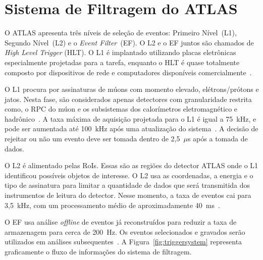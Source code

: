 
\chapter{Sistema de Filtragem do ATLAS}

O ATLAS apresenta três níveis de seleção de eventos: Primeiro Nível~(L1),
Segundo Nível~(L2) e o \emph{Event Filter}~(EF). O L2 e o EF juntos são chamados
de \emph{High Level Trigger} (HLT). O L1 é implantado utilizando placas
eletrônicas especialmente projetadas para a tarefa, enquanto o HLT é quase 
totalmente composto por dispositivos de rede e computadores disponíveis
comercialmente~\cite{ref:2010performance}.

O L1 procura por assinaturas de múons com momento elevado, elétrons/prótons e
jatos. Nesta fase, são considerados apenas detectores com granularidade restrita
como, o RPC do múon e os subsistemas dos calorímetros eletromagnético e
hadrônico~\cite{LEVEL1TRIGGER}. A taxa máxima de aquisição projetada para o L1 é
igual a 75~kHz, e pode ser aumentada até 100~kHz após uma atualização do
sistema~\cite{ATLAS2008}. A decisão de rejeitar ou não um evento deve ser tomada
dentro de 2,5~$\mu$s após a tomada de dados.

O L2 é alimentado pelas RoIs. Essas são as regiões do detector ATLAS onde o L1
identificou possíveis objetos de interesse. O L2 usa as coordenadas, a energia e
o tipo de assinatura para limitar a quantidade de dados que será transmitida
dos instrumentos de leitura do detector. Nesse momento, a taxa de eventos cai
para 3,5~kHz, com um processamento médio de aproximadamente
40~ms~\cite{ATLAS2008}.

O EF usa análise \emph{offline} de eventos já reconstruídos para reduzir a taxa
de armazenagem para cerca de 200~Hz. Os eventos selecionados e gravados serão
utilizados em análises subsequentes~\cite{ARMSTRONG2004}. A
Figura~\ref{fig:triggersystem} representa graficamente o fluxo de informações do
sistema de filtragem.

